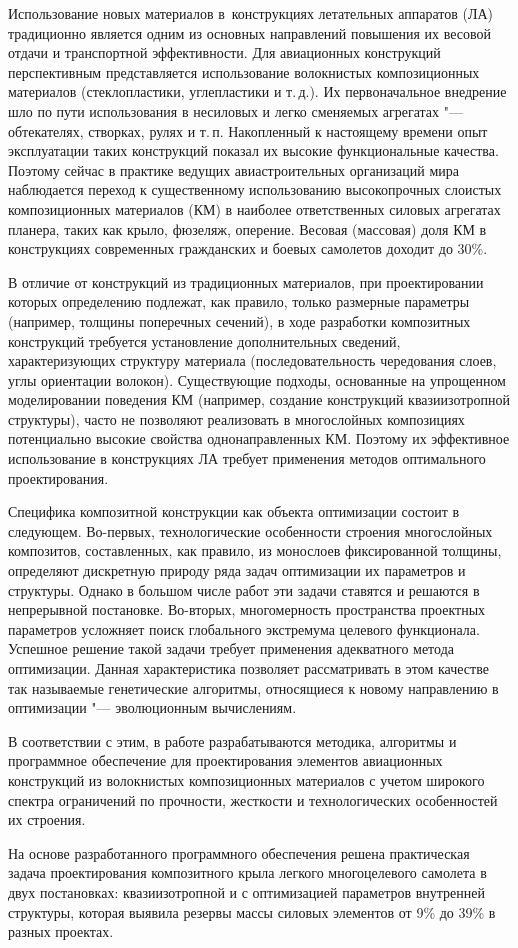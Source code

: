 {\small

Использование новых материалов в~конструкциях летательных аппаратов (ЛА) традиционно является одним из
основных направлений повышения их весовой отдачи и транспортной
эффективности. Для авиационных конструкций перспективным представляется
использование волокнистых композиционных материалов (стеклопластики,
углепластики и т.\,д.). Их первоначальное внедрение шло по пути использования
в несиловых и легко сменяемых агрегатах "--- обтекателях, створках, рулях и т.\,п.
Накопленный к настоящему времени опыт эксплуатации таких конструкций
показал их высокие функциональные качества. Поэтому сейчас в практике
ведущих авиастроительных организаций мира наблюдается переход к
существенному использованию высокопрочных слоистых композиционных
материалов (КМ) в наиболее ответственных силовых агрегатах планера, таких
как крыло, фюзеляж, оперение. Весовая (массовая) доля КМ в конструкциях
современных гражданских и боевых самолетов доходит до 30\%.

В отличие от конструкций из традиционных материалов, при
проектировании которых определению подлежат, как правило, только
размерные параметры (например, толщины поперечных сечений), в ходе
разработки композитных конструкций требуется установление дополнительных
сведений, характеризующих структуру материала (последовательность
чередования слоев, углы ориентации волокон). Существующие подходы,
основанные на упрощенном моделировании поведения КМ (например, создание
конструкций квазиизотропной структуры), часто не позволяют реализовать в
многослойных        композициях      потенциально      высокие      свойства
однонаправленных КМ. Поэтому их эффективное использование в
конструкциях ЛА требует применения методов оптимального проектирования.

Специфика композитной конструкции как объекта оптимизации состоит в
следующем. Во-первых, технологические особенности строения многослойных
композитов, составленных, как правило, из монослоев фиксированной
толщины, определяют дискретную природу ряда задач оптимизации их
параметров и структуры. Однако в большом числе работ эти задачи ставятся и
решаются в непрерывной постановке. Во-вторых, многомерность пространства
проектных параметров усложняет поиск глобального экстремума целевого
функционала. Успешное решение такой задачи требует применения
адекватного метода оптимизации. Данная характеристика позволяет
рассматривать в этом качестве так называемые генетические алгоритмы,
относящиеся к новому направлению в оптимизации "--- эволюционным
вычислениям.

В соответствии с этим, в работе  разрабатываются методика, алгоритмы и программное
обеспечение для проектирования элементов авиационных конструкций из
волокнистых композиционных материалов с учетом широкого спектра
ограничений по прочности, жесткости и технологических особенностей их
строения.

На основе  разработанного программного обеспечения     
решена практическая задача проектирования композитного
крыла легкого многоцелевого самолета в двух постановках: квазиизотропной и
с оптимизацией параметров внутренней структуры, которая выявила резервы
массы силовых элементов от 9\% до 39\% в разных проектах.

}


